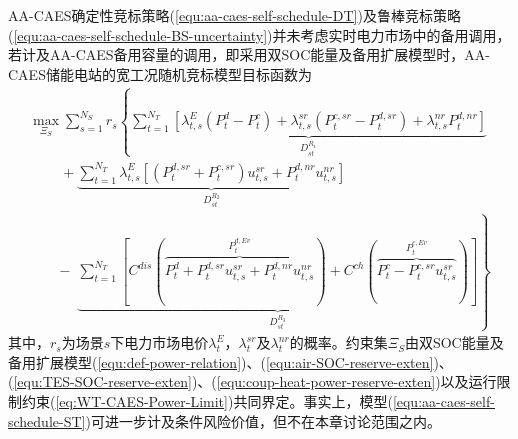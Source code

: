 AA-CAES确定性竞标策略(\ref{equ:aa-caes-self-schedule-DT})及鲁棒竞标策略(\ref{equ:aa-caes-self-schedule-BS-uncertainty})并未考虑实时电力市场中的备用调用，若计及AA-CAES备用容量的调用，即采用双SOC能量及备用扩展模型时，AA-CAES储能电站的宽工况随机竞标模型目标函数为
\begin{equation}
\label{equ:aa-caes-self-schedule-ST}
\begin{array}{l}
\mathop {\max }\limits_{\Xi_{S}} \sum\limits_{s = 1}^{{N_S}} {{r_s}} \left\{ {\underbrace {\sum\limits_{t = 1}^{N_T} {[ {\lambda _{t,s}^E({P_t^d - P_t^c}) + \lambda _{t,s}^{sr}({P_t^{c,sr} - P_t^{d,sr}}) + \lambda _{t,s}^{nr}P_t^{d,nr}}]} }_{D_{st}^{{R_1}}}} \right.\;\\
\;\;\;\;\;\;\;\; + \underbrace {\sum\limits_{t = 1}^{N_T} {\lambda _{t,s}^E[{({P_t^{d,sr} + P_t^{c,sr}})u_{t,s}^{sr} + P_t^{d,nr}u_{t,s}^{nr}}]} }_{D_{st}^{{R_2}}}\\
\;\;\;\;\;\;\; - \left. {\;\underbrace {\sum\limits_{t = 1}^{N_T} {[{C^{dis}({\overbrace {P_t^d + P_t^{d,sr}u_{t,s}^{sr} + P_t^{d,nr}u_{t,s}^{nr}}^{P_t^{d,Ev}}}) + C^{ch}({\overbrace {P_t^c - P_t^{c,sr}u_{t,s}^{sr}}^{P_t^{c,Ev}}})}]} }_{D_{st}^{{R_3}}}} \right\}
\end{array}
\end{equation}
其中，$r_s$为场景$s$下电力市场电价$\lambda_t^E$，$\lambda_t^{sr}$及$\lambda_t^{nr}$的概率。约束集$\Xi_{S}$由双SOC能量及备用扩展模型(\ref{equ:def-power-relation})、(\ref{equ:air-SOC-reserve-exten})、(\ref{equ:TES-SOC-reserve-exten})、(\ref{equ:coup-heat-power-reserve-exten})以及运行限制约束(\ref{eq:WT-CAES-Power-Limit})共同界定。事实上，模型(\ref{equ:aa-caes-self-schedule-ST})可进一步计及条件风险价值，但不在本章讨论范围之内。



